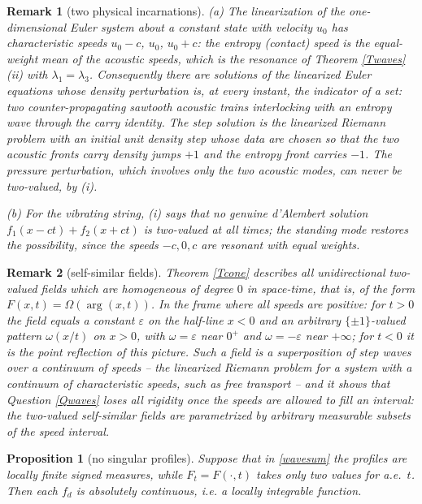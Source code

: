 \documentclass{article}
\newtheorem{proposition}{Proposition}
\newtheorem{remark}{Remark}
\begin{document}
	\begin{remark}[two physical incarnations]
		(a) The linearization of the one-dimensional Euler system about a constant state with velocity $u_0$ has characteristic speeds $u_0-c$, $u_0$, $u_0+c$: the entropy (contact) speed is the equal-weight mean of the acoustic speeds, which is the resonance of Theorem \ref{Twaves}(ii) with $\lambda_1=\lambda_3$. Consequently there are solutions of the linearized Euler equations whose density perturbation is, at every instant, the indicator of a set: two counter-propagating sawtooth acoustic trains interlocking with an entropy wave through the carry identity. The step solution is the linearized Riemann problem with an initial unit density step whose data are chosen so that the two acoustic fronts carry density jumps $+1$ and the entropy front carries $-1$. The pressure perturbation, which involves only the two acoustic modes, can never be two-valued, by (i).

		(b) For the vibrating string, (i) says that no genuine d'Alembert solution $f_1(x-ct)+f_2(x+ct)$ is two-valued at all times; the standing mode restores the possibility, since the speeds $-c,0,c$ are resonant with equal weights.
	\end{remark}

	\begin{remark}[self-similar fields]
		Theorem \ref{Tcone} describes all unidirectional two-valued fields which are homogeneous of degree $0$ in space-time, that is, of the form $F(x,t)=\Omega(\arg(x,t))$. In the frame where all speeds are positive: for $t>0$ the field equals a constant $\varepsilon$ on the half-line $x<0$ and an arbitrary $\{\pm1\}$-valued pattern $\omega(x/t)$ on $x>0$, with $\omega=\varepsilon$ near $0^+$ and $\omega=-\varepsilon$ near $+\infty$; for $t<0$ it is the point reflection of this picture. Such a field is a superposition of step waves over a continuum of speeds -- the linearized Riemann problem for a system with a continuum of characteristic speeds, such as free transport -- and it shows that Question \ref{Qwaves} loses all rigidity once the speeds are allowed to fill an interval: the two-valued self-similar fields are parametrized by arbitrary measurable subsets of the speed interval.
	\end{remark}

	\begin{proposition}[no singular profiles]\label{Pdist}
		Suppose that in \eqref{wavesum} the profiles are locally finite signed measures, while $F_t=F(\cdot,t)$ takes only two values for a.e.\ $t$. Then each $f_d$ is absolutely continuous, i.e. a locally integrable function.
	\end{proposition}
\end{document}
